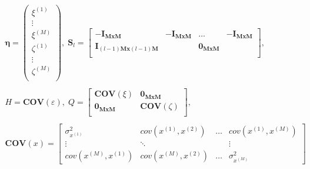 \documentclass[11pt]{llncs} %
\begin{document}
\begin{center}
\begin{equation*}
\begin{array}{c}
\boldsymbol{\eta} = \begin{pmatrix}
\xi^{(1)}\\\vdots\\\xi^{(M)}\\
\zeta^{(1)}\\\vdots\\\zeta^{(M)}\\
\end{pmatrix},\;

\mathbf{S}_{{l}} = \begin{bmatrix}
-\mathbf{I_{MxM}} & -\mathbf{I_{MxM}} & \dots & -\mathbf{I_{MxM}} \\
\mathbf{I}_{({l}-1)\mathbf{Mx}({l}-1)\mathbf{M}} & & \mathbf{0_{MxM}}\\
\end{bmatrix}, \\ \\

H = \mathbf{COV}(\varepsilon),\;

Q =  \begin{bmatrix}
 \mathbf{COV}(\xi) &  \mathbf{0_{M x M}} \\
 \mathbf{0_{M x M}} &  \mathbf{COV}(\zeta) \\
 \end{bmatrix}, \\\\
 \mathbf{COV}(x) = \begin{bmatrix}
 \sigma^{2}_{x^{(1)}} & cov(x^{(1)},x^{(2)}) & \dots & cov(x^{(1)},x^{(M)}) \\
 \vdots & \ddots & & \vdots \\ 
 cov(x^{(M)},x^{(1)}) & cov(x^{(M)},x^{(2)}) & \dots & \sigma^{2}_{x^{(M)}} 
\end{bmatrix}


\end{array}
\end{equation*}
\end{center}
\end{document}
